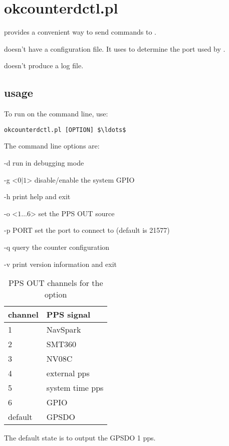 \section{okcounterdctl.pl \label{s:okcounterdctl}}

 provides a convenient way to send commands to .

 doesn't have a configuration file. It uses
 to determine the port used by .

 doesn't produce a log file.

\subsection{usage}

To run  on the command line, use:
\begin{lstlisting}[mathescape=true]
okcounterdctl.pl [OPTION] $\ldots$
\end{lstlisting}
The command line options are:
\begin{description*}
	\item[-d]	run in debugging mode
	\item[-g \textless $0|1$\textgreater] disable/enable the system GPIO
	\item[-h]	print help and exit
	\item[-o \textless $1\ldots6$\textgreater] set the PPS OUT source
	\item[-p PORT]  set the port to connect to  (default is 21577)
	\item[-q] query the counter configuration
	\item[-v]	print version information and exit
\end{description*}


\begin{table}[h]
\begin{centering}
\begin{tabular}{ll}
channel & PPS signal \\ \hline
1 & NavSpark\\
2 & SMT360\\
3 & NV08C\\
4 & external pps\\
5 & system time pps\\
6 & GPIO\\
default & GPSDO
\end{tabular}
\caption{PPS OUT channels for the  option}
\end{centering}
\end{table}


The default state is to output the GPSDO 1 pps.


